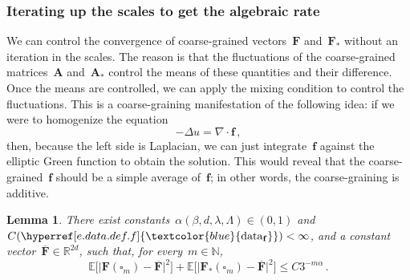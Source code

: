 \documentclass[11pt,twoside]{article} %
\let\oldsquare\square %
\renewcommand{\square}{\oldsquare}
\numberwithin{equation}{section}
\newtheorem{lemma}[theorem]{Lemma}
\theoremstyle{definition}
\newcommand{\datareff}{\hyperref[e.data.def.f]{\textcolor{blue}{\ensuremath{\mathrm{data}_{\mathbf{f}}}}}}
\newcommand*{\N}{\ensuremath{\mathbb{N}}}
\newcommand*{\R}{\ensuremath{\mathbb{R}}}
\newcommand{\f}{\mathbf{f}}
\newcommand{\cu}{\square}
\newcommand{\E}{\mathbb{E}}
\newcommand{\bfA}{\mathbf{A}}
\newcommand{\bfF}{\mathbf{F}}
\begin{document}
\subsubsection{Iterating up the scales to get the algebraic rate}

We can control the convergence of coarse-grained vectors~$\bfF$ and~$\bfF_*$ without an iteration in the scales. The reason is that the fluctuations of the coarse-grained matrices~$\bfA$ and~$\bfA_*$ control the means of these quantities and their difference. Once the means are controlled, we can apply the mixing condition to control the fluctuations. 
This is a coarse-graining manifestation of the following idea: if we were to homogenize the equation
\begin{equation*}
-\Delta u = \nabla \cdot \f \,,
\end{equation*}
then, because the left side is Laplacian, we can just integrate~$\f$ against the elliptic Green function to obtain the solution. This would reveal that the coarse-grained~$\f$ should be a simple average of~$\f$; in other words, the coarse-graining is additive. 

\begin{lemma} 
\label{l.bF.converge}
There exist constants~$\alpha(\beta,d,\lambda,\Lambda) \in (0,1)$ and~$C(\datareff) < \infty$, and a constant vector~$\overline{\bfF} \in \R^{2d}$,  such that, for every~$m \in \N$, 
\begin{equation}
\label{e.bfF.convergeE}
\E \bigl[  \bigl| \bfF(\cu_m) - \overline{\bfF} \bigr|^2 \Bigr]
+
\E \bigl[  \bigl| \bfF_*(\cu_m) - \overline{\bfF} \bigr|^2 \Bigr]
\leq 
C3^{-m\alpha}\,.
\end{equation}
\end{lemma}
\end{document}
